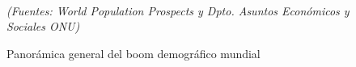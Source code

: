 \newpage
\begin{figure}[!ht]
\vspace{-0.5cm}
\hspace*{-1.1cm}
\caption{Panor\'amica general del boom demogr\'afico mundial}\\
\hspace{2cm}\textit{(Fuentes: World Population Prospects y Dpto. Asuntos Econ\'omicos y Sociales ONU)}
\end{figure}


